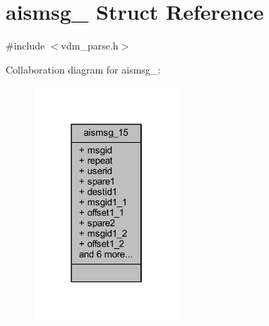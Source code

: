 \hypertarget{structaismsg__15}{}\section{aismsg\+\_ Struct Reference}
\label{structaismsg__15}


{\ttfamily \#include $<$vdm\+\_\+parse.\+h$>$}



Collaboration diagram for aismsg\+\_\+:
\nopagebreak
\begin{figure}[H]
\begin{center}
\leavevmode
\includegraphics[width=154pt]{structaismsg__15__coll__graph}
\end{center}
\end{figure}
